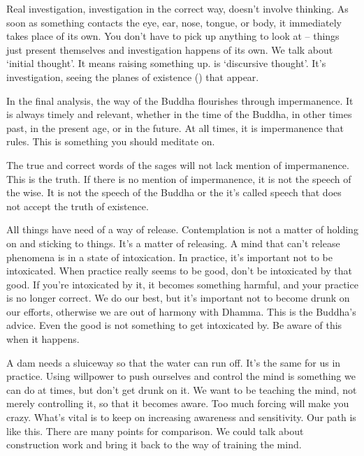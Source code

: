 Real investigation, investigation in the correct way, doesn't involve thinking. As soon as something contacts the eye, ear, nose, tongue, or body, it immediately takes place of its own. You don't have to pick up anything to look at -- things just present themselves and investigation happens of its own. We talk about  `initial thought'. It means raising something up.  is `discursive thought'. It's investigation, seeing the planes of existence () that appear.

In the final analysis, the way of the Buddha flourishes through impermanence. It is always timely and relevant, whether in the time of the Buddha, in other times past, in the present age, or in the future. At all times, it is impermanence that rules. This is something you should meditate on.

The true and correct words of the sages will not lack mention of impermanence. This is the truth. If there is no mention of impermanence, it is not the speech of the wise. It is not the speech of the Buddha or the  it's called speech that does not accept the truth of existence.

All things have need of a way of release. Contemplation is not a matter of holding on and sticking to things. It's a matter of releasing. A mind that can't release phenomena is in a state of intoxication. In practice, it's important not to be intoxicated. When practice really seems to be good, don't be intoxicated by that good. If you're intoxicated by it, it becomes something harmful, and your practice is no longer correct. We do our best, but it's important not to become drunk on our efforts, otherwise we are out of harmony with Dhamma. This is the Buddha's advice. Even the good is not something to get intoxicated by. Be aware of this when it happens.

A dam needs a sluiceway so that the water can run off. It's the same for us in practice. Using willpower to push ourselves and control the mind is something we can do at times, but don't get drunk on it. We want to be teaching the mind, not merely controlling it, so that it becomes aware. Too much forcing will make you crazy. What's vital is to keep on increasing awareness and sensitivity. Our path is like this. There are many points for comparison. We could talk about construction work and bring it back to the way of training the mind.

